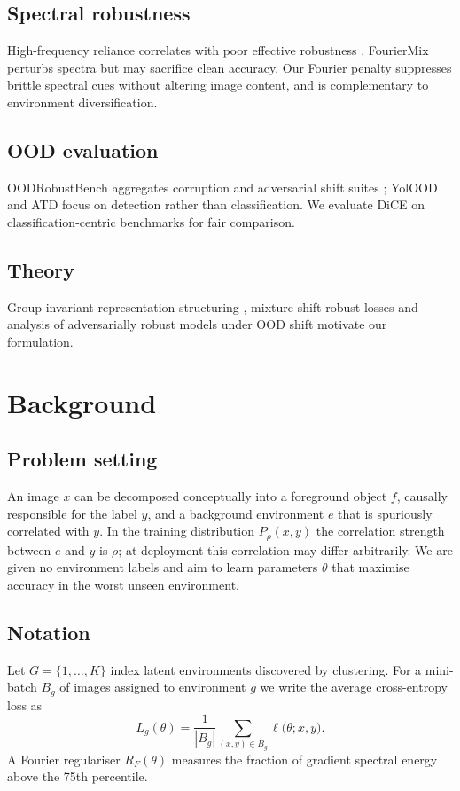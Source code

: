 \documentclass{article}
\begin{document}
\subsection{Spectral robustness}
High-frequency reliance correlates with poor effective robustness \cite{fridovichkeil-2022-models}. FourierMix perturbs spectra but may sacrifice clean accuracy. Our Fourier penalty suppresses brittle spectral cues without altering image content, and is complementary to environment diversification.

\subsection{OOD evaluation}
OODRobustBench aggregates corruption and adversarial shift suites \cite{li-2023-oodrobustbench}; YolOOD \cite{zolfi-2022-yolood} and ATD \cite{azizmalayeri-2022-your} focus on detection rather than classification. We evaluate DiCE on classification-centric benchmarks for fair comparison.

\subsection{Theory}
Group-invariant representation structuring \cite{author-year-structuring}, mixture-shift-robust losses \cite{author-year-distri} and analysis of adversarially robust models under OOD shift \cite{author-year-the} motivate our formulation.

\section{Background}
\subsection{Problem setting}
An image $x$ can be decomposed conceptually into a foreground object $f$, causally responsible for the label $y$, and a background environment $e$ that is spuriously correlated with $y$. In the training distribution $P_{\rho}(x,y)$ the correlation strength between $e$ and $y$ is $\rho$; at deployment this correlation may differ arbitrarily. We are given no environment labels and aim to learn parameters $\theta$ that maximise accuracy in the worst unseen environment.

\subsection{Notation}
Let $G = \{1,\ldots,K\}$ index latent environments discovered by clustering. For a mini-batch $B_g$ of images assigned to environment $g$ we write the average cross-entropy loss as
\[
  L_g(\theta) = \frac{1}{|B_g|} \sum_{(x,y)\in B_g} \ell\bigl(\theta; x, y\bigr).
\]
A Fourier regulariser $R_F(\theta)$ measures the fraction of gradient spectral energy above the 75th percentile.
\end{document}
